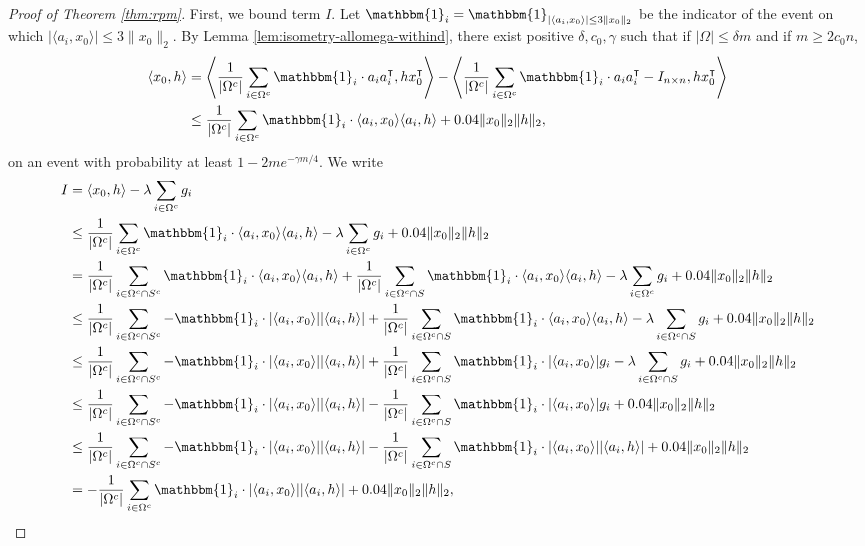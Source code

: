 \documentclass[12pt]{article}
\newcommand{\1}{\mathbbm{1}}
\newcommand{\xo}{x_0}
\newcommand{\Omegac}{\Omega^c}
\newcommand{\inddefwithnorm}{\mathbbm{1}_{|\langle a_i, \xo \rangle| \leq 3 \| \xo \|_2}}
\newcommand{\ind}{\mathbbm{1}_i}
\newcommand{\aixo}{\langle a_i, \xo \rangle}
\newcommand{\aih}{\langle a_i, h \rangle}
\newcommand{\xoxohh}{\|\xo\|_2 \|h\|_2}
\begin{document}
\begin{proof}[Proof of Theorem \ref{thm:rpm}]
First, we bound term $I$.   Let $\ind = \inddefwithnorm$ be the indicator of the event on which  $| \aixo| \leq 3 \| \xo\|_2$.   By Lemma \ref{lem:isometry-allomega-withind}, there exist positive $\delta, c_0, \gamma$ such that if $|\Omega| \leq \delta m$ and if $m \geq 2 c_0 n$, 
\begin{align}
\langle \xo, h \rangle &= \left \langle \frac{1}{|\Omegac|} \sum_{i \in \Omegac} \ind \cdot a_i a_i^\intercal, h \xo^\intercal \right \rangle - \left \langle \frac{1}{|\Omegac|} \sum_{i\in \Omegac} \ind \cdot a_i a_i^\intercal - I_{n\times n} , h \xo^\intercal \right \rangle \notag \\
&\leq \frac{1}{|\Omegac|} \sum_{i \in \Omegac} \ind \cdot \langle a_i, \xo \rangle \langle a_i, h\rangle + 0.04 \| \xo \|_2 \|h\|_2, \label{isometry-bound}
\end{align}
on an event with probability at least $1 - 2 m e^{-\gamma m/4}$.   We write
\begin{align}
I &= \langle \xo, h \rangle - \lambda \sum_{i \in \Omegac} g_i \notag\\
& \leq \frac{1}{|\Omegac|} \sum_{i \in \Omegac} \ind \cdot \aixo \aih - \lambda \sum_{i \in \Omegac} g_i + 0.04 \xoxohh  \notag\\
& = \frac{1}{|\Omegac|} \sum_{i \in \Omegac \cap S^c} \ind \cdot \aixo \aih + \frac{1}{|\Omegac|} \sum_{i \in \Omegac \cap S} \ind \cdot \aixo \aih - \lambda \sum_{i \in \Omegac} g_i + 0.04 \xoxohh  \notag\\
& \leq \frac{1}{|\Omegac|} \sum_{i \in \Omegac \cap S^c} -\ind \cdot |\aixo||\aih|  + \frac{1}{|\Omegac|} \sum_{i \in \Omegac \cap S} \ind \cdot \aixo \aih - \lambda \sum_{i \in \Omegac \cap S} g_i + 0.04 \xoxohh  \notag\\
& \leq \frac{1}{|\Omegac|} \sum_{i \in \Omegac \cap S^c} -\ind \cdot |\aixo||\aih|  + \frac{1}{|\Omegac|} \sum_{i \in \Omegac \cap S} \ind \cdot |\aixo| g_i - \lambda \sum_{i \in \Omegac \cap S} g_i + 0.04 \xoxohh  \notag\\
& \leq \frac{1}{|\Omegac|} \sum_{i \in \Omegac \cap S^c} -\ind \cdot |\aixo||\aih|  - \frac{1}{|\Omegac|} \sum_{i \in \Omegac \cap S} \ind \cdot |\aixo| g_i + 0.04 \xoxohh  \notag\\
& \leq \frac{1}{|\Omegac|} \sum_{i \in \Omegac \cap S^c} -\ind \cdot |\aixo||\aih|  - \frac{1}{|\Omegac|} \sum_{i \in \Omegac \cap S} \ind \cdot |\aixo| |\aih| + 0.04 \xoxohh  \notag\\
&= -\frac{1}{|\Omegac|} \sum_{i \in \Omegac} \ind \cdot |\aixo||\aih| + 0.04 \xoxohh,  \label{aixoaihxoxohh}

\end{align}
\end{proof}
\end{document}
